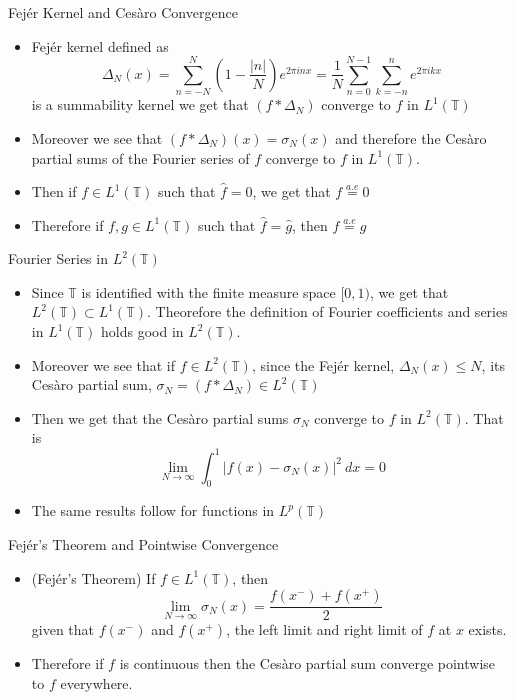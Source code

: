 \documentclass[compress]{beamer}
\newcommand{\T}{\mathbb T}
\begin{document}
\begin{frame}{Fej\'er Kernel and Ces\`aro Convergence}
  \begin{itemize}
    \item Fej\'er kernel defined as $$\Delta_N(x) = \sum_{n=-N}^N\left(1 - \frac{|n|}{N} \right)e^{2\pi inx} = \frac{1}{N}\sum_{n=0}^{N-1}\sum_{k=-n}^n e^{2\pi i k x}$$
      is a summability kernel we get that $(f*\Delta_N)$ converge to $f$ in $L^1(\T)$
      \pause
    \item Moreover we see that $(f*\Delta_N)(x) = \sigma_N(x)$ and therefore the Ces\`aro partial sums of the Fourier series of $f$ converge to $f$ in $L^1(\T)$.
      \pause
    \item Then if $f \in L^1(\T)$ such that $\hat{f} = 0$, we get that $f \stackrel{a.e}{=} 0$
      \pause
    \item Therefore if $f, g \in L^1(\T)$ such that $\hat{f} = \hat{g}$, then $f \stackrel{a.e}{=} g$
  \end{itemize}
\end{frame}

\begin{frame}{Fourier Series in $L^2(\T)$}
  \begin{itemize}
    \item Since $\T$ is identified with the finite measure space $[0, 1)$, we get that $L^2(\T) \subset L^1(\T)$. Theorefore the definition of Fourier coefficients and series in $L^1(\T)$ holds good in $L^2(\T)$.
      \pause
    \item Moreover we see that if $f \in L^2(\T)$, since the Fej\'er kernel, $\Delta_N(x) \le N$, its Ces\`aro partial sum, $\sigma_N = (f*\Delta_N) \in L^2(\T)$
      \pause
    \item Then we get that the Ces\`aro partial sums $\sigma_N$ converge to $f$ in $L^2(\T)$. That is $$\lim_{N\to \infty} \int_0^1 \left| f(x) - \sigma_N(x)\right|^2 \ dx  = 0 $$
      \pause
    \item The same results follow for functions in $L^p(\T)$
  \end{itemize}
\end{frame}

\begin{frame}{Fej\'er's Theorem and Pointwise Convergence}
  \begin{itemize}
    \item (Fej\'er's Theorem) If $f \in L^1(\T)$, then 
      \begin{equation}
        \lim_{N \to \infty} \sigma_N(x) = \frac{f(x^-) + f(x^+)}{2}
        \label{eq:Fejer_thm}
      \end{equation}
    given that $f(x^-)$ and $f(x^+)$, the left limit and right limit of $f$ at $x$ exists.
      \pause
    \item Therefore if $f$ is continuous then the Ces\`aro partial sum converge pointwise to $f$ everywhere.
  \end{itemize}
\end{frame}
\end{document}
